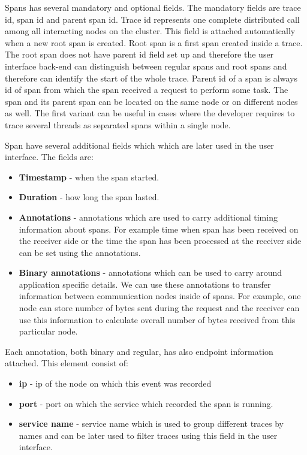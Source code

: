 Spans has several mandatory and optional fields. The mandatory fields are trace id, span id and parent span id. Trace id represents one complete distributed call among all interacting nodes on the cluster. This field is attached automatically when a new root span is created. Root span is a first span created inside a trace. The root span does not have parent id field set up and therefore the user interface back-end can distinguish between regular spans and root spans and therefore can identify the start of the whole trace. Parent id of a span is always id of span from which the span received a request to perform some task. The span and its parent span can be located on the same node or on different nodes as well. The first variant can be useful in cases where the developer requires to trace several threads as separated spans within a single node.  

Span have several additional fields which which are later used in the user interface. The fields are:
\begin{itemize}
	\item \textbf{Timestamp} - when the span started.
	\item \textbf{Duration} - how long the span lasted.
	\item \textbf{Annotations} - annotations which are used to carry additional timing information about spans. For example time when span has been received on the receiver side or the time the span has been processed at the receiver side can be set using the annotations.
	\item \textbf{Binary annotations} - annotations which can be used to carry around application specific details. We can use these annotations to transfer information between communication nodes inside of spans. For example, one node can store number of bytes sent during the request and the receiver can use this information to calculate overall number of bytes received from this particular node.
\end{itemize}

Each annotation, both binary and regular, has also endpoint information attached. This element consist of:
\begin{itemize}
	\item \textbf{ip} - ip of the node on which this event was recorded
	\item \textbf{port} - port on which the service which recorded the span is running.
	\item \textbf{service name} - service name which is used to group different traces by names and can be later used to filter traces using this field in the user interface.
\end{itemize}

